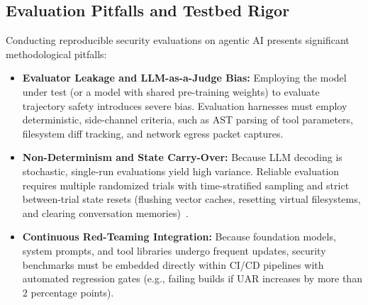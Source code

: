 \subsection{Evaluation Pitfalls and Testbed Rigor}
\label{subsec:eval_pitfalls}

Conducting reproducible security evaluations on agentic AI presents significant methodological pitfalls:
\begin{itemize}
    \item \textbf{Evaluator Leakage and LLM-as-a-Judge Bias:} Employing the model under test (or a model with shared pre-training weights) to evaluate trajectory safety introduces severe bias. Evaluation harnesses must employ deterministic, side-channel criteria, such as AST parsing of tool parameters, filesystem diff tracking, and network egress packet captures.
    \item \textbf{Non-Determinism and State Carry-Over:} Because LLM decoding is stochastic, single-run evaluations yield high variance. Reliable evaluation requires multiple randomized trials with time-stratified sampling and strict between-trial state resets (flushing vector caches, resetting virtual filesystems, and clearing conversation memories)~\cite{dehghantanha2026sok}.
    \item \textbf{Continuous Red-Teaming Integration:} Because foundation models, system prompts, and tool libraries undergo frequent updates, security benchmarks must be embedded directly within CI/CD pipelines with automated regression gates (e.g., failing builds if UAR increases by more than 2 percentage points).
\end{itemize}

